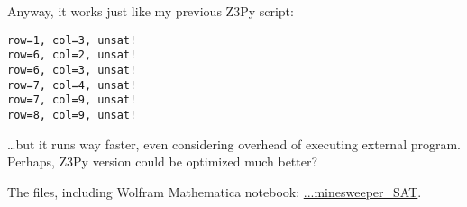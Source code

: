 Anyway, it works just like my previous Z3Py script:

\begin{lstlisting}
row=1, col=3, unsat!
row=6, col=2, unsat!
row=6, col=3, unsat!
row=7, col=4, unsat!
row=7, col=9, unsat!
row=8, col=9, unsat!
\end{lstlisting}

\dots but it runs way faster, even considering overhead of executing external program.
Perhaps, Z3Py version could be optimized much better?

The files, including Wolfram Mathematica notebook: 
\url{...minesweeper_SAT}.

